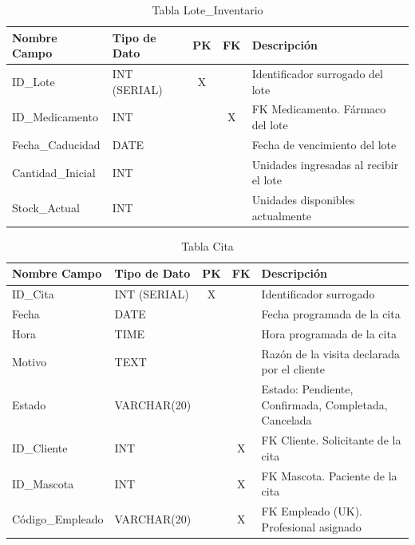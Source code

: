 \begin{table}[H]
\centering
\footnotesize
\begin{tabular}{|l|l|c|c|p{5cm}|}
\hline
\textbf{Nombre Campo} & \textbf{Tipo de Dato} & \textbf{PK} & \textbf{FK} & \textbf{Descripción} \\
\hline
ID\_Lote & INT (SERIAL) & X & & Identificador surrogado del lote \\
\hline
ID\_Medicamento & INT & & X & FK Medicamento. Fármaco del lote \\
\hline
Fecha\_Caducidad & DATE & & & Fecha de vencimiento del lote \\
\hline
Cantidad\_Inicial & INT & & & Unidades ingresadas al recibir el lote \\
\hline
Stock\_Actual & INT & & & Unidades disponibles actualmente \\
\hline
\end{tabular}
\caption{Tabla Lote\_Inventario}
\end{table}

\begin{table}[H]
\centering
\footnotesize
\begin{tabular}{|l|l|c|c|p{5cm}|}
\hline
\textbf{Nombre Campo} & \textbf{Tipo de Dato} & \textbf{PK} & \textbf{FK} & \textbf{Descripción} \\
\hline
ID\_Cita & INT (SERIAL) & X & & Identificador surrogado \\
\hline
Fecha & DATE & & & Fecha programada de la cita \\
\hline
Hora & TIME & & & Hora programada de la cita \\
\hline
Motivo & TEXT & & & Razón de la visita declarada por el cliente \\
\hline
Estado & VARCHAR(20) & & & Estado: Pendiente, Confirmada, Completada, Cancelada \\
\hline
ID\_Cliente & INT & & X & FK Cliente. Solicitante de la cita \\
\hline
ID\_Mascota & INT & & X & FK Mascota. Paciente de la cita \\
\hline
Código\_Empleado & VARCHAR(20) & & X & FK Empleado (UK). Profesional asignado \\
\hline
\end{tabular}
\caption{Tabla Cita}
\end{table}

